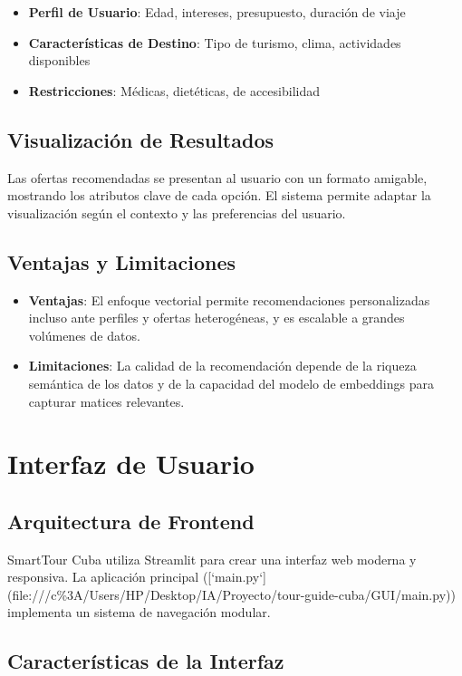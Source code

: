 \documentclass[runningheads]{llncs}
\begin{document}
\begin{itemize}
\item \textbf{Perfil de Usuario}: Edad, intereses, presupuesto, duración de viaje
\item \textbf{Características de Destino}: Tipo de turismo, clima, actividades disponibles
\item \textbf{Restricciones}: Médicas, dietéticas, de accesibilidad
\end{itemize}

\subsection{Visualización de Resultados}

Las ofertas recomendadas se presentan al usuario con un formato amigable, mostrando los atributos clave de cada opción. El sistema permite adaptar la visualización según el contexto y las preferencias del usuario.

\subsection{Ventajas y Limitaciones}

\begin{itemize}
    \item \textbf{Ventajas}: El enfoque vectorial permite recomendaciones personalizadas incluso ante perfiles y ofertas heterogéneas, y es escalable a grandes volúmenes de datos.
    \item \textbf{Limitaciones}: La calidad de la recomendación depende de la riqueza semántica de los datos y de la capacidad del modelo de embeddings para capturar matices relevantes.
\end{itemize}

\section{Interfaz de Usuario}

\subsection{Arquitectura de Frontend}

SmartTour Cuba utiliza Streamlit para crear una interfaz web moderna y responsiva. La aplicación principal ([`main.py`](file:///c\%3A/Users/HP/Desktop/IA/Proyecto/tour-guide-cuba/GUI/main.py)) implementa un sistema de navegación modular.

\subsection{Características de la Interfaz}
\end{document}
